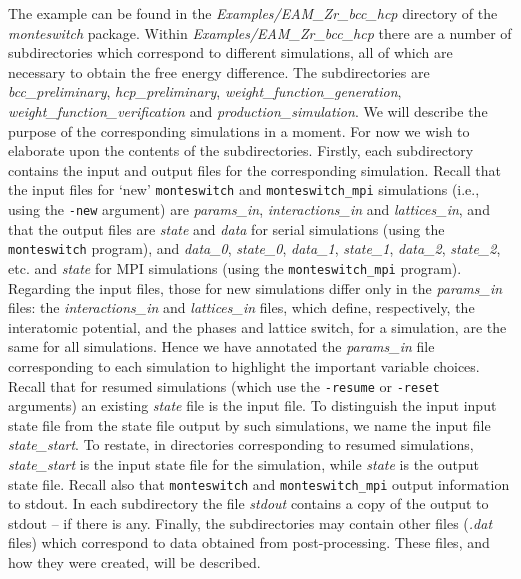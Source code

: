 \documentclass{report}
\begin{document}
The example can be found in the \emph{Examples/EAM\_Zr\_bcc\_hcp} directory of the \emph{monteswitch} package. Within 
\emph{Examples/EAM\_Zr\_bcc\_hcp} there are a number of subdirectories which correspond to different simulations, all of which are 
necessary to obtain the free energy difference. The subdirectories are \emph{bcc\_preliminary}, \emph{hcp\_preliminary},
\emph{weight\_function\_generation}, \emph{weight\_function\_verification} and \emph{production\_simulation}. We will describe the
purpose of the corresponding simulations in a moment. For now we wish to elaborate upon the contents of the subdirectories. Firstly, each 
subdirectory contains the input and output files for the corresponding simulation. Recall that the input files for `new' 
\texttt{monteswitch} and \texttt{monteswitch\_mpi} simulations (i.e., using the \texttt{-new} argument)
are \emph{params\_in}, \emph{interactions\_in} and \emph{lattices\_in}, and that the output files are \emph{state} and \emph{data} 
for serial simulations (using the \texttt{monteswitch} program), and \emph{data\_0}, \emph{state\_0}, \emph{data\_1}, \emph{state\_1},
\emph{data\_2}, \emph{state\_2}, etc. and \emph{state} for MPI simulations (using the \texttt{monteswitch\_mpi} program). Regarding the input
files, those for new simulations differ only in the \emph{params\_in} files: the \emph{interactions\_in} and \emph{lattices\_in} files,
which define, respectively, the interatomic potential, and the phases and lattice switch, for a simulation, 
are the same for all simulations. Hence we have annotated the \emph{params\_in} file corresponding to each simulation
to highlight the important variable choices. Recall that for resumed simulations (which use the \texttt{-resume} or \texttt{-reset} arguments)
an existing \emph{state} file is the input file. To distinguish the input input state file from the state file output
by such simulations, we name the input file \emph{state\_start}. To restate, in directories corresponding to resumed simulations,
\emph{state\_start} is the input state file for the simulation, while \emph{state} is the output state file.
Recall also that \texttt{monteswitch} and \texttt{monteswitch\_mpi} output information to stdout. 
In each subdirectory the file \emph{stdout} contains a copy of the output to stdout -- if there is any. Finally, the 
subdirectories may contain other files (\emph{.dat} files) which correspond to data obtained from post-processing. These files,
and how they were created, will be described.
\end{document}
